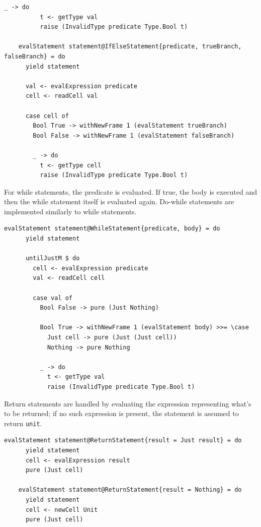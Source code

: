 \documentclass[UdineBachThesis,american,11pt]{PhdThesis}
\begin{document}
  \pagebreak

  \begin{Verbatim}[gobble=4,fontsize=\small]
        _ -> do
          t <- getType val
          raise (InvalidType predicate Type.Bool t)

    evalStatement statement@IfElseStatement{predicate, trueBranch, falseBranch} = do
      yield statement

      val <- evalExpression predicate
      cell <- readCell val

      case cell of
        Bool True -> withNewFrame 1 (evalStatement trueBranch)
        Bool False -> withNewFrame 1 (evalStatement falseBranch)

        _ -> do
          t <- getType cell
          raise (InvalidType predicate Type.Bool t)
  \end{Verbatim}

  For while statements, the predicate is evaluated. If true, the body is
  executed and then the while statement itself is evaluated again. Do-while
  statements are implemented similarly to while statements.

  \begin{Verbatim}[gobble=4,fontsize=\small]
    evalStatement statement@WhileStatement{predicate, body} = do
      yield statement

      untilJustM $ do
        cell <- evalExpression predicate
        val <- readCell cell

        case val of
          Bool False -> pure (Just Nothing)

          Bool True -> withNewFrame 1 (evalStatement body) >>= \case
            Just cell -> pure (Just (Just cell))
            Nothing -> pure Nothing

          _ -> do
            t <- getType val
            raise (InvalidType predicate Type.Bool t)
  \end{Verbatim}

  Return statements are handled by evaluating the expression representing what's
  to be returned; if no such expression is present, the statement is assumed to
  return \mbox{\texttt{unit}}.

  \begin{Verbatim}[gobble=4,fontsize=\small]
    evalStatement statement@ReturnStatement{result = Just result} = do
      yield statement
      cell <- evalExpression result
      pure (Just cell)

    evalStatement statement@ReturnStatement{result = Nothing} = do
      yield statement
      cell <- newCell Unit
      pure (Just cell)
  \end{Verbatim}
\end{document}
